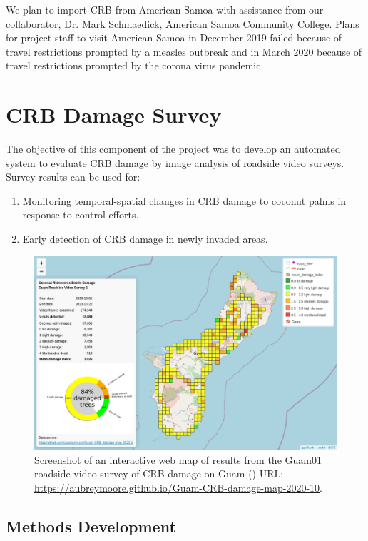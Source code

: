 \documentclass[12pt,
letterpaper,english,bibliography=totocnumbered, abstract=on]{scrartcl}
\begin{document}
We plan to import CRB from American Samoa with assistance from our collaborator, Dr. Mark Schmaedick, American Samoa Community College. Plans for project staff to visit American Samoa in December 2019 failed because of travel restrictions prompted by a measles outbreak and in March 2020 because of travel restrictions prompted by the corona virus pandemic. 

\section{CRB Damage Survey}

The objective of this component of the project was to develop an automated system to evaluate CRB damage by image analysis of roadside video surveys.  Survey results can be used for:
\begin{enumerate}
	\item Monitoring temporal-spatial changes in CRB damage to coconut palms in response to control efforts.
	\item Early detection of CRB damage in newly invaded areas.
\end{enumerate}

\begin{figure}[h]
	\centering
	\includegraphics[width=\linewidth]{images/Guam01-webmap}
	\caption{Screenshot of an interactive web map of results from the Guam01 roadside video survey of CRB damage on Guam (\cite{mooreWebMapGuamCRBdamagemap2020102020}) URL: \url{https://aubreymoore.github.io/Guam-CRB-damage-map-2020-10}.}
	\label{fig:guam01webmap}
\end{figure}


\subsection{Methods Development}
\end{document}
